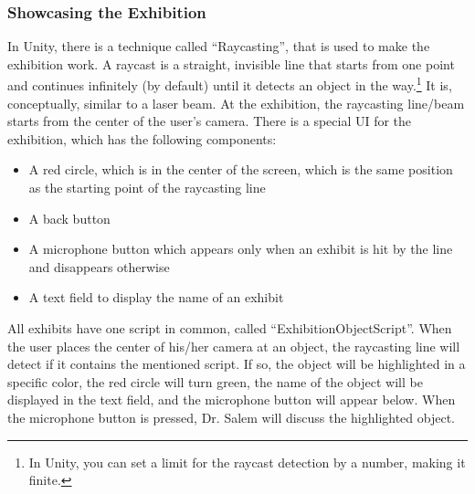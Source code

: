 \subsubsection*{Showcasing the Exhibition}
\label{ShowcasingExhibition}
In Unity, there is a technique called “Raycasting”, that is used to make the exhibition work. A raycast is a straight, invisible line that starts from one point and continues infinitely (by default) until it detects an object in the way.\footnote{In Unity, you can set a limit for the raycast detection by a number, making it finite.}  It is, conceptually, similar to a laser beam. At the exhibition, the raycasting line/beam starts from the center of the user’s camera. There is a special UI for the exhibition, which has the following components:
\begin{itemize}
    \item{A red circle, which is in the center of the screen, which is the same position as the starting point of the raycasting line}
    
    \item{A back button}
    
    \item{A microphone button which appears only when an exhibit is hit by the line and disappears otherwise}
    
    \item{A text field to display the name of an exhibit}
    
\end{itemize}
All exhibits have one script in common, called “ExhibitionObjectScript\normalfont”. When the user places the center of his/her camera at an object, the raycasting line will detect if it contains the mentioned script. If so, the object will be highlighted in a specific color, the red circle will turn green, the name of the object will be displayed in the text field, and the microphone button will appear below. When the microphone button is pressed, Dr. Salem will discuss the highlighted object.

